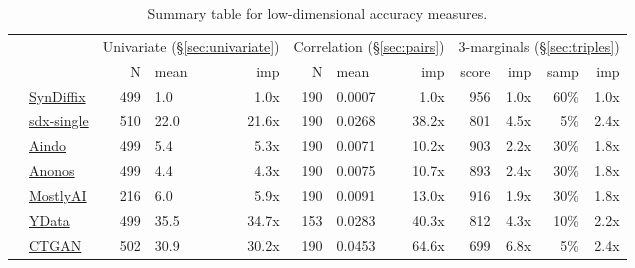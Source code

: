 \begin{table}
    \centering
    \caption{Summary table for low-dimensional accuracy measures.}
    \label{tab:accuracy}
    \begin{tabular}{llrlr@{\hskip 10pt}r@{\hskip 6pt}l@{\hskip 6pt}r@{\hskip 10pt}r@{\hskip 6pt}r@{\hskip 6pt}r@{\hskip 6pt}r}
        \toprule
          &   & \multicolumn{3}{c}{Univariate (\S\ref{sec:univariate})} & \multicolumn{3}{c}{Correlation (\S\ref{sec:pairs})} & \multicolumn{4}{c}{3-marginals (\S\ref{sec:triples})} \\
        
 & & N & mean & imp & N & mean & imp & score & imp & samp & imp \\
\midrule
        \cellcolor{blue} & \href{https://htmlpreview.github.io/?https://github.com/yoid2000/sdnist-summary/blob/main/results/syndiffix_all/report.html}{SynDiffix} & 499 & 1.0 & 1.0x & 190 & 0.0007 & 1.0x & 956 & 1.0x & 60\% & 1.0x \\
        \cellcolor{blue} & \href{https://htmlpreview.github.io/?https://github.com/yoid2000/sdnist-summary/blob/main/results/sdx_single/report.html}{sdx-single} & 510 & 22.0 & 21.6x & 190 & 0.0268 & 38.2x & 801 & 4.5x & 5\% & 2.4x \\
        \cellcolor{red} & \href{https://htmlpreview.github.io/?https://github.com/yoid2000/sdnist-summary/blob/main/results/aindo_synth/report.html}{Aindo} & 499 & 5.4 & 5.3x & 190 & 0.0071 & 10.2x & 903 & 2.2x & 30\% & 1.8x \\
        \cellcolor{red} & \href{https://htmlpreview.github.io/?https://github.com/yoid2000/sdnist-summary/blob/main/results/anonos_sdk/report.html}{Anonos} & 499 & 4.4 & 4.3x & 190 & 0.0075 & 10.7x & 893 & 2.4x & 30\% & 1.8x \\
        \cellcolor{red} & \href{https://htmlpreview.github.io/?https://github.com/yoid2000/sdnist-summary/blob/main/results/mostlyai_sd_platform/report.html}{MostlyAI} & 216 & 6.0 & 5.9x & 190 & 0.0091 & 13.0x & 916 & 1.9x & 30\% & 1.8x \\
        \cellcolor{red} & \href{https://htmlpreview.github.io/?https://github.com/yoid2000/sdnist-summary/blob/main/results/ydata_fabric_synthesizers/report.html}{YData} & 499 & 35.5 & 34.7x & 153 & 0.0283 & 40.3x & 812 & 4.3x & 10\% & 2.2x \\
        \cellcolor{red} & \href{https://htmlpreview.github.io/?https://github.com/yoid2000/sdnist-summary/blob/main/results/sdv_ctgan_epochs1000/report.html}{CTGAN} & 502 & 30.9 & 30.2x & 190 & 0.0453 & 64.6x & 699 & 6.8x & 5\% & 2.4x \\

\end{tabular}
\end{table}
